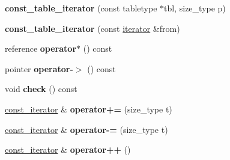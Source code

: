 \begin{DoxyCompactItemize}
\item 
{\bfseries const\+\_\+table\+\_\+iterator} (const tabletype $\ast$tbl, size\+\_\+type p)\hypertarget{classspp___1_1const__table__iterator_aa5e54b7d872dbda3b9faebd6eb6ccac3}{}\label{classspp___1_1const__table__iterator_aa5e54b7d872dbda3b9faebd6eb6ccac3}

\item 
{\bfseries const\+\_\+table\+\_\+iterator} (const \hyperlink{classspp___1_1table__iterator}{iterator} \&from)\hypertarget{classspp___1_1const__table__iterator_ad6e19a302456864237caf4012531a469}{}\label{classspp___1_1const__table__iterator_ad6e19a302456864237caf4012531a469}

\item 
reference {\bfseries operator$\ast$} () const \hypertarget{classspp___1_1const__table__iterator_aa49edad72879dade51a817309392a605}{}\label{classspp___1_1const__table__iterator_aa49edad72879dade51a817309392a605}

\item 
pointer {\bfseries operator-\/$>$} () const \hypertarget{classspp___1_1const__table__iterator_aa57c8bf6acd8b104da27c49f2ff254dc}{}\label{classspp___1_1const__table__iterator_aa57c8bf6acd8b104da27c49f2ff254dc}

\item 
void {\bfseries check} () const \hypertarget{classspp___1_1const__table__iterator_a46fda9d394b650876a64a86134563de8}{}\label{classspp___1_1const__table__iterator_a46fda9d394b650876a64a86134563de8}

\item 
\hyperlink{classspp___1_1const__table__iterator}{const\+\_\+iterator} \& {\bfseries operator+=} (size\+\_\+type t)\hypertarget{classspp___1_1const__table__iterator_af3b7541661c9ad01b67a4e0e42d66a6b}{}\label{classspp___1_1const__table__iterator_af3b7541661c9ad01b67a4e0e42d66a6b}

\item 
\hyperlink{classspp___1_1const__table__iterator}{const\+\_\+iterator} \& {\bfseries operator-\/=} (size\+\_\+type t)\hypertarget{classspp___1_1const__table__iterator_a842639eb73161612043ebc8c493c6ca0}{}\label{classspp___1_1const__table__iterator_a842639eb73161612043ebc8c493c6ca0}

\item 
\hyperlink{classspp___1_1const__table__iterator}{const\+\_\+iterator} \& {\bfseries operator++} ()\hypertarget{classspp___1_1const__table__iterator_a05eea225de6d37643072d7797aec1263}{}\label{classspp___1_1const__table__iterator_a05eea225de6d37643072d7797aec1263}


\end{DoxyCompactItemize}
